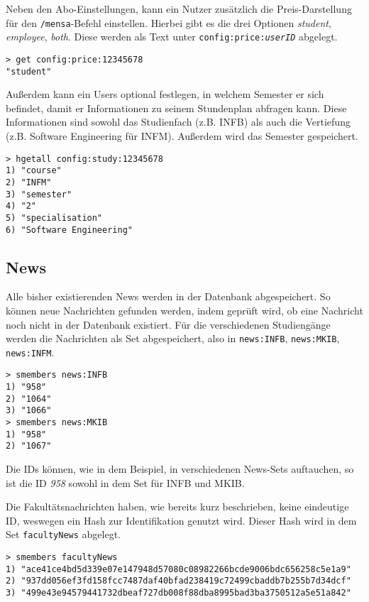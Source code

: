 Neben den Abo-Einstellungen, kann ein Nutzer zusätzlich die Preis-Darstellung für den \texttt{/mensa}-Befehl einstellen. Hierbei gibt es die drei Optionen \textit{student}, \textit{employee}, \textit{both}. Diese werden als Text unter \texttt{config:price:\textit{userID}} abgelegt.

\begin{lstlisting}[caption={Preis-Einstellungen eines Users}]
> get config:price:12345678
"student"
\end{lstlisting}

Außerdem kann ein Users optional festlegen, in welchem Semester er sich befindet, damit er Informationen zu seinem Stundenplan abfragen kann. Diese Informationen sind sowohl das Studienfach (z.B. INFB) als auch die Vertiefung (z.B. Software Engineering für INFM). Außerdem wird das Semester gespeichert.

\begin{lstlisting}[caption={Studiumeinstellung eines Users}]
> hgetall config:study:12345678
1) "course"
2) "INFM"
3) "semester"
4) "2"
5) "specialisation"
6) "Software Engineering"
\end{lstlisting}

\subsection{News}
Alle bisher existierenden News werden in der Datenbank abgespeichert. So können neue Nachrichten gefunden werden, indem geprüft wird, ob eine Nachricht noch nicht in der Datenbank existiert. Für die verschiedenen Studiengänge werden die Nachrichten als Set abgespeichert, also in \texttt{news:INFB}, \texttt{news:MKIB}, \texttt{news:INFM}.

\begin{lstlisting}[caption={Auflistung der bekannten Nachrichten}]
> smembers news:INFB
1) "958"
2) "1064"
3) "1066"
> smembers news:MKIB
1) "958"
2) "1067"
\end{lstlisting}

Die IDs können, wie in dem Beispiel, in verschiedenen News-Sets auftauchen, so ist die ID \textit{958} sowohl in dem Set für INFB und MKIB.

Die Fakultätsnachrichten haben, wie bereits kurz beschrieben, keine eindeutige ID, weswegen ein Hash zur Identifikation genutzt wird. Dieser Hash wird in dem Set \texttt{faculty\-News} abgelegt.

\begin{lstlisting}[caption={Auflistung der bekannten Fakultätsnachrichten}]
> smembers facultyNews
1) "ace41ce4bd5d339e07e147948d57080c08982266bcde9006bdc656258c5e1a9"
2) "937dd056ef3fd158fcc7487daf40bfad238419c72499cbaddb7b255b7d34dcf"
3) "499e43e94579441732dbeaf727db008f88dba8995bad3ba3750512a5e51a842"
\end{lstlisting}

